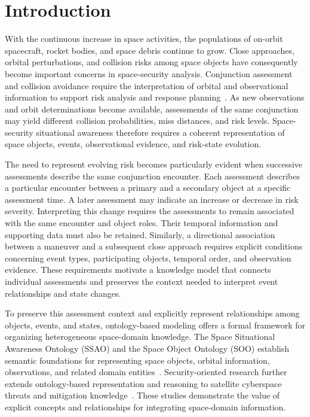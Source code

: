 \documentclass[Royal,sageh,times]{sagej}
\begin{document}
\section{Introduction}

With the continuous increase in space activities, the populations of on-orbit spacecraft, rocket bodies, and space debris continue to grow. Close approaches, orbital perturbations, and collision risks among space objects have consequently become important concerns in space-security analysis. Conjunction assessment and collision avoidance require the interpretation of orbital and observational information to support risk analysis and response planning~\citep{nasa_cara_handbook}. As new observations and orbit determinations become available, assessments of the same conjunction may yield different collision probabilities, miss distances, and risk levels. Space-security situational awareness therefore requires a coherent representation of space objects, events, observational evidence, and risk-state evolution.

The need to represent evolving risk becomes particularly evident when successive assessments describe the same conjunction encounter. Each assessment describes a particular encounter between a primary and a secondary object at a specific assessment time. A later assessment may indicate an increase or decrease in risk severity. Interpreting this change requires the assessments to remain associated with the same encounter and object roles. Their temporal information and supporting data must also be retained. Similarly, a directional association between a maneuver and a subsequent close approach requires explicit conditions concerning event types, participating objects, temporal order, and observation evidence. These requirements motivate a knowledge model that connects individual assessments and preserves the context needed to interpret event relationships and state changes.

To preserve this assessment context and explicitly represent relationships among objects, events, and states, ontology-based modeling offers a formal framework for organizing heterogeneous space-domain knowledge. The Space Situational Awareness Ontology (SSAO) and the Space Object Ontology (SOO) establish semantic foundations for representing space objects, orbital information, observations, and related domain entities~\citep{rovetto2016ssao,cox2016soo}. Security-oriented research further extends ontology-based representation and reasoning to satellite cyberspace threats and mitigation knowledge~\citep{liu2023ontocsa}. These studies demonstrate the value of explicit concepts and relationships for integrating space-domain information.
\end{document}
